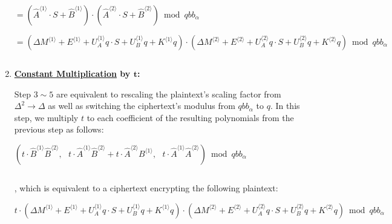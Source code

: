 \begin{enumerate}
$ = (\hat{A}^{\langle 1 \rangle}\cdot S + \hat{B}^{\langle 1 \rangle}) \cdot (\hat{A}^{\langle 2 \rangle}\cdot S + \hat{B}^{\langle 2 \rangle})  \bmod qbb_\alpha$

$ = (\Delta M^{\langle 1 \rangle} + E^{\langle 1 \rangle} + U_A^{\langle 1 \rangle}q \cdot S + U_B^{\langle 1 \rangle}q + K^{\langle 1 \rangle} q) \cdot ( \Delta M^{\langle 2 \rangle} + E^{\langle 2 \rangle} + U_A^{\langle 2 \rangle}q \cdot S + U_B^{\langle 2 \rangle}q + K^{\langle 2 \rangle} q)  \bmod qbb_\alpha$

$ $

\item \textbf{\underline{Constant Multiplication} by $\bm t$:} 

Step $3 \sim 5$ are equivalent to rescaling the plaintext's scaling factor from $\Delta^2 \rightarrow \Delta$ as well as switching the ciphertext's modulus from $qbb_\alpha$ to $q$.
In this step, we multiply $t$ to each coefficient of the resulting polynomials from the previous step as follows: 

$(t\cdot\hat{B}^{\langle 1 \rangle}\hat{B}^{\langle 2 \rangle}, \text{ } t\cdot\hat{A}^{\langle 1 \rangle}\hat{B}^{\langle 2 \rangle} + t\cdot\hat{A}^{\langle 2 \rangle}B^{\langle 1 \rangle}, \text{ } t\cdot\hat{A}^{\langle 1 \rangle}\hat{A}^{\langle 2 \rangle}) \bmod qbb_\alpha$

$ $

, which is equivalent to a ciphertext encrypting the following plaintext:

$ t\cdot(\Delta M^{\langle 1 \rangle} + E^{\langle 1 \rangle} + U_A^{\langle 1 \rangle}q \cdot S + U_B^{\langle 1 \rangle}q  + K^{\langle 1 \rangle} q)\cdot(\Delta M^{\langle 2 \rangle} + E^{\langle 2 \rangle} + U_A^{\langle 2 \rangle}q \cdot S + U_B^{\langle 2 \rangle}q  + K^{\langle 2 \rangle} q) \bmod qbb_\alpha$

$ $






\end{enumerate}
